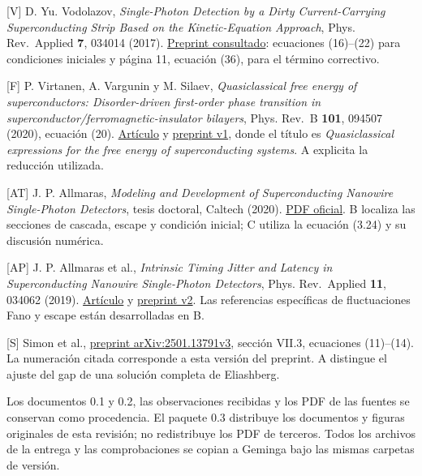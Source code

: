 \documentclass[
  spanish,
  10pt,
  a4paper,
]{article}
\begin{document}
{[}V{]} D. Yu. Vodolazov, \emph{Single-Photon Detection by a Dirty
Current-Carrying Superconducting Strip Based on the Kinetic-Equation
Approach}, Phys. Rev.~Applied \textbf{7}, 034014 (2017).
\href{https://arxiv.org/pdf/1611.06060}{Preprint consultado}: ecuaciones
(16)--(22) para condiciones iniciales y página 11, ecuación (36), para
el término correctivo.

{[}F{]} P. Virtanen, A. Vargunin y M. Silaev, \emph{Quasiclassical free
energy of superconductors: Disorder-driven first-order phase transition
in superconductor/ferromagnetic-insulator bilayers}, Phys. Rev.~B
\textbf{101}, 094507 (2020), ecuación (20).
\href{https://doi.org/10.1103/PhysRevB.101.094507}{Artículo} y
\href{https://arxiv.org/pdf/1909.00992v1}{preprint v1}, donde el título
es \emph{Quasiclassical expressions for the free energy of
superconducting systems}. A explicita la reducción utilizada.

{[}AT{]} J. P. Allmaras, \emph{Modeling and Development of
Superconducting Nanowire Single-Photon Detectors}, tesis doctoral,
Caltech (2020).
\href{https://thesis.caltech.edu/13748/08/Allmaras_Thesis_Final.pdf}{PDF
oficial}. B localiza las secciones de cascada, escape y condición
inicial; C utiliza la ecuación (3.24) y su discusión numérica.

{[}AP{]} J. P. Allmaras et al., \emph{Intrinsic Timing Jitter and
Latency in Superconducting Nanowire Single-Photon Detectors}, Phys.
Rev.~Applied \textbf{11}, 034062 (2019).
\href{https://doi.org/10.1103/PhysRevApplied.11.034062}{Artículo} y
\href{https://arxiv.org/pdf/1805.00130v2}{preprint v2}. Las referencias
específicas de fluctuaciones Fano y escape están desarrolladas en B.

{[}S{]} Simon et al., \href{https://arxiv.org/pdf/2501.13791v3}{preprint
arXiv:2501.13791v3}, sección VII.3, ecuaciones (11)--(14). La numeración
citada corresponde a esta versión del preprint. A distingue el ajuste
del gap de una solución completa de Eliashberg.

Los documentos 0.1 y 0.2, las observaciones recibidas y los PDF de las
fuentes se conservan como procedencia. El paquete 0.3 distribuye los
documentos y figuras originales de esta revisión; no redistribuye los
PDF de terceros. Todos los archivos de la entrega y las comprobaciones
se copian a Geminga bajo las mismas carpetas de versión.
\end{document}
